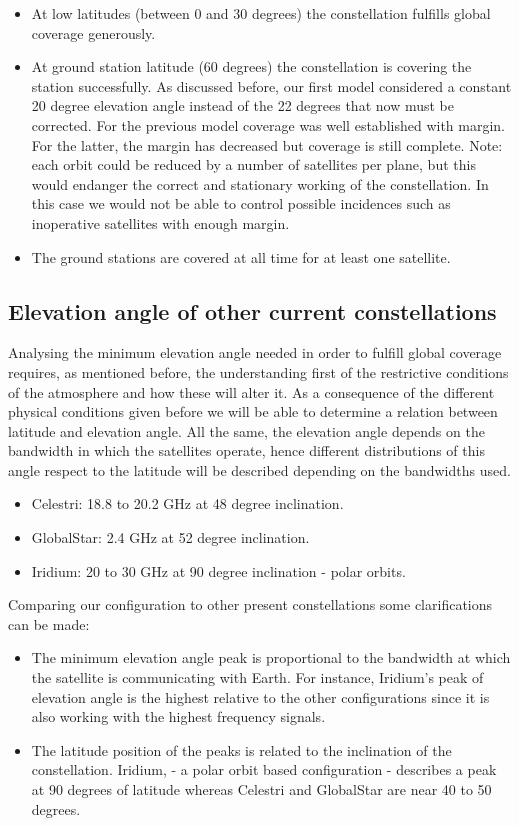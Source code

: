 \begin{itemize}
\item At low latitudes (between 0 and 30 degrees) the constellation fulfills global coverage generously.
\item At ground station latitude (60 degrees) the constellation is covering the station successfully. As discussed before, our first model considered a constant 20 degree elevation angle instead of the 22 degrees that now must be corrected. For the previous model coverage was well established with margin. For the latter, the margin has decreased but coverage is still complete. Note: each orbit could be reduced by a number of satellites per plane, but this would endanger the correct and stationary working of the constellation. In this case we would not be able to control possible incidences such as inoperative satellites with enough margin.
\item The ground stations are covered at all time for at least one satellite.
\end{itemize}

\subsection{Elevation angle of other current constellations}
Analysing the minimum elevation angle needed in order to fulfill global coverage requires, as mentioned before, the understanding first of the restrictive conditions of the atmosphere and how these will alter it. As a consequence of the different physical conditions given before we will be able to determine a relation between latitude and elevation angle. All the same, the elevation angle depends on the bandwidth in which the satellites operate, hence different distributions of this angle respect to the latitude will be described depending on the bandwidths used. 

\begin{itemize}
\item Celestri: 18.8 to 20.2 GHz at 48 degree inclination.
\item GlobalStar: 2.4 GHz at 52 degree inclination.
\item Iridium: 20 to 30 GHz at 90 degree inclination - polar orbits.
\end{itemize}

Comparing our configuration to other present constellations some clarifications can be made: 

\begin{itemize}
\item The minimum elevation angle peak is proportional to the bandwidth at which the satellite is communicating with Earth. For instance, Iridium's peak of elevation angle is the highest relative to the other configurations since it is also working with the highest frequency signals.
\item The latitude position of the peaks is related to the inclination of the constellation. Iridium, - a polar orbit based configuration - describes a peak at 90 degrees of latitude whereas Celestri and GlobalStar are near 40 to 50 degrees.
\end{itemize}


